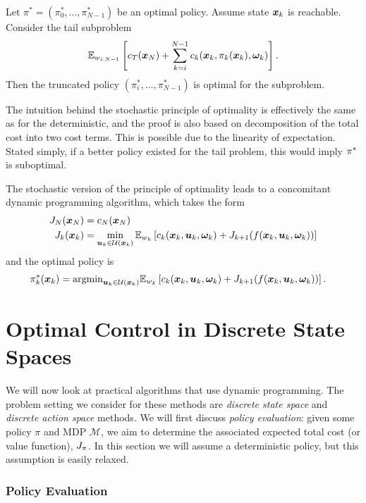 \begin{theorem}
Let $\pi^* = (\pi_0^*, \ldots, \pi^*_{N-1})$ be an optimal policy. Assume state $\bm{x}_k$ is reachable. Consider the tail subproblem
\begin{equation}
\mathbb{E}_{w_{i:N-1}}\left[ c_T(\bm{x}_N) + \sum_{k=i}^{N-1} c_k(\bm{x}_k,\pi_k(\bm{x}_k),\bm{\omega}_k) \right].
\end{equation}
Then the truncated policy $(\pi_i^*, \ldots, \pi^*_{N-1})$ is optimal for the subproblem.
\end{theorem}
The intuition behind the stochastic principle of optimality is effectively the same as for the deterministic, and the proof is also based on decomposition of the total cost into two cost terms. This is possible due to the linearity of expectation. Stated simply, if a better policy existed for the tail problem, this would imply $\pi^*$ is suboptimal. 

The stochastic version of the principle of optimality leads to a concomitant dynamic programming algorithm, which takes the form
\begin{align}
    J_N(\bm{x}_N) &= c_N(\bm{x}_N)\\
    J_k(\bm{x}_k) &= \min_{\bm{u}_k \in \mathcal{U}(\bm{x}_k)} \mathbb{E}_{w_k} \left[ c_k(\bm{x}_k,\bm{u}_k,\bm{\omega}_k) + J_{k+1}(f(\bm{x}_k,\bm{u}_k,\bm{\omega}_k)) \right]
    \label{eq:DP_rec_stoch}
\end{align}
and the optimal policy is
\begin{align}
    \pi^*_k(\bm{x}_k) &= \text{argmin}_{\bm{u}_k \in \mathcal{U}(\bm{x}_k)} \mathbb{E}_{w_k} \left[ c_k(\bm{x}_k,\bm{u}_k,\bm{\omega}_k) + J_{k+1}(f(\bm{x}_k,\bm{u}_k,\bm{\omega}_k)) \right].
    \label{eq:DP_rec_stoch}
\end{align}


\section{Optimal Control in Discrete State Spaces}

We will now look at practical algorithms that use dynamic programming. The problem setting we consider for these methods are \textit{discrete state space} and \textit{discrete action space} methods. We will first discuss \textit{policy evaluation}: given some policy $\pi$ and MDP $\mathcal{M}$, we aim to determine the associated expected total cost (or value function), $J_{\pi}$. In this section we will assume a deterministic policy, but this assumption is easily relaxed.

\subsubsection{Policy Evaluation}

